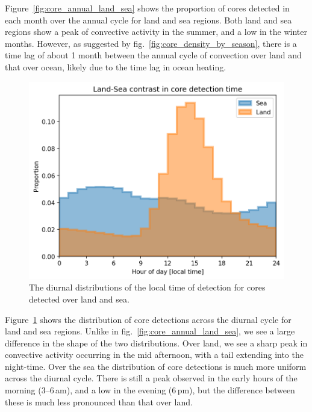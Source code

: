 Figure~\ref{fig:core_annual_land_sea} shows the proportion of cores detected in each month over the annual cycle for land and sea regions.
Both land and sea regions show a peak of convective activity in the summer, and a low in the winter months.
However, as suggested by fig.~\ref{fig:core_density_by_season}, there is a time lag of about 1 month between the annual cycle of convection over land and that over ocean, likely due to the time lag in ocean heating.

\begin{figure}[tp]
    \centering
    \includegraphics[width=\textwidth]{figures/ch2_land_sea_diurnal.png}
    \caption[
    The diurnal distributions of the local time of detection for cores detected over land and sea
    ]{
    The diurnal distributions of the local time of detection for cores detected over land and sea.
    }
    \label{fig:core_diurnal_land_sea}
\end{figure}

Figure~\ref{fig:core_diurnal_land_sea} shows the distribution of core detections across the diurnal cycle for land and sea regions.
Unlike in fig.~\ref{fig:core_annual_land_sea}, we see a large difference in the shape of the two distributions.
Over land, we see a sharp peak in convective activity occurring in the mid afternoon, with a tail extending into the night-time.
Over the sea the distribution of core detections is much more uniform across the diurnal cycle.
There is still a peak observed in the early hours of the morning (3--6\,am), and a low in the evening (6\,pm), but the difference between these is much less pronounced than that over land.

